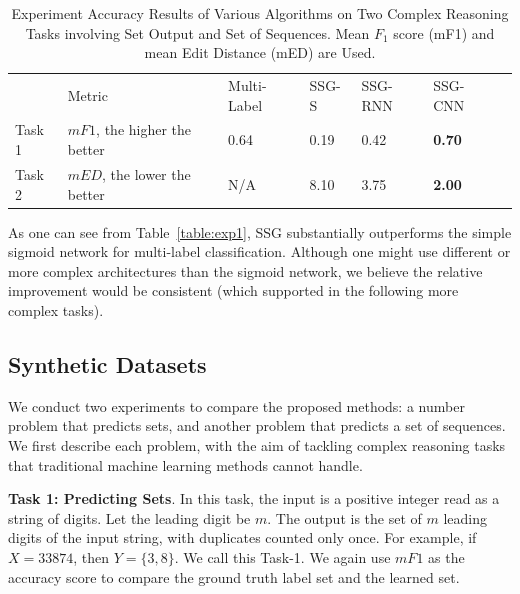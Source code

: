 \documentclass[letterpaper]{article} %
\begin{document}
\begin{table}[!htbp]
\centering
\caption{Experiment Accuracy Results of Various Algorithms on Two Complex Reasoning Tasks involving Set Output and Set of Sequences. \newline Mean $F_1$ score (mF1) and mean Edit Distance (mED) are Used. }
\label{table:res}
\begin{tabular}{|l||l||l| l|l|l|l}
\cline{1-6}
  \rule{0pt}{4ex}       &Metric & Multi-Label & SSG-S & SSG-RNN & SSG-CNN &  \\ \cline{1-6}
\rule{0pt}{2ex}    Task 1 & $mF1$, the higher the better & 0.64 &  0.19   &    0.42     &    {\bf  0.70}   &  \\
 \cline{1-6}
\rule{0pt}{2ex}    Task 2 & $mED$, the lower the better & N/A & 8.10     &  3.75      &   {\bf  2.00}     &  \\ \cline{1-6}
\end{tabular}
\end{table}


As one can see from Table~\ref{table:exp1}, SSG  substantially outperforms the simple sigmoid network for multi-label classification. Although one might use different or more complex architectures than the sigmoid network, we believe the relative improvement would be consistent (which supported in the following more complex tasks).

\subsection{Synthetic Datasets}
We conduct two experiments to compare the proposed methods: a number problem that predicts sets, and another problem that predicts a set of sequences. We first describe each problem, with the aim of tackling complex reasoning tasks that traditional machine learning methods cannot handle.

\noindent\textbf{Task 1: Predicting Sets}.
In this task, the input is a positive integer read as a string of digits. Let the leading digit be $m$. The output is the set of $m$ leading digits of the input string, with duplicates counted only once. For example, if $X=33874$, then $Y=\{3,8\}$. We call this Task-1. We again use $mF1$ as the accuracy score to compare the ground truth label set and the learned set.
\end{document}
